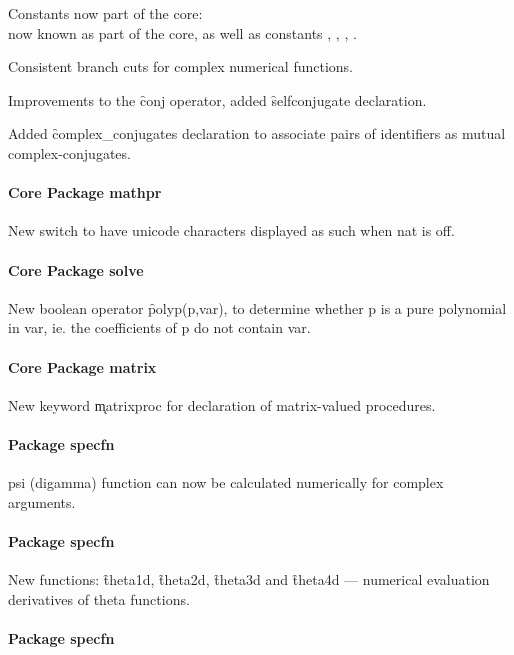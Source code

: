 Constants now part of the core:\\
 now known as part of the
core, as well as constants , , ,
.

Consistent branch cuts for complex numerical functions.

Improvements to the \f{conj} operator, added \f{selfconjugate} declaration.

Added \f{complex\_conjugates} declaration to associate pairs of identifiers
as mutual complex-conjugates.

\paragraph*{Core Package mathpr}

New switch  to have unicode characters
displayed as such when nat is off.

\paragraph*{Core Package solve}

New boolean operator \f{polyp}(p,var), to determine whether p is a pure polynomial
in var, ie. the coefficients of p do not contain var.

\paragraph*{Core Package matrix}

New keyword \k{matrixproc} for declaration of matrix-valued procedures.

\paragraph{Package specfn}

psi (digamma) function can now be calculated numerically for complex arguments.

\paragraph{Package specfn}

New functions: \f{theta1d}, \f{theta2d}, \f{theta3d} and \f{theta4d}
--- numerical evaluation derivatives of theta functions.

\paragraph{Package specfn}

